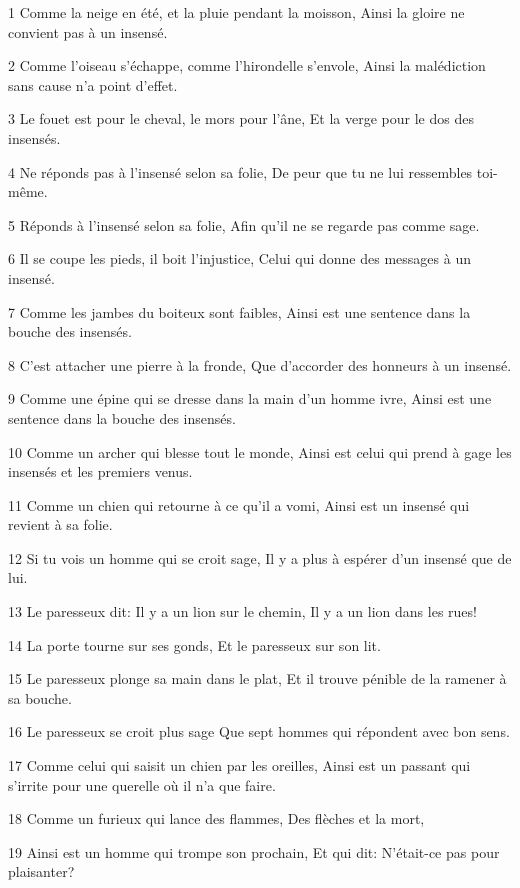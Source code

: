 \par 1 Comme la neige en été, et la pluie pendant la moisson, Ainsi la gloire ne convient pas à un insensé.
\par 2 Comme l'oiseau s'échappe, comme l'hirondelle s'envole, Ainsi la malédiction sans cause n'a point d'effet.
\par 3 Le fouet est pour le cheval, le mors pour l'âne, Et la verge pour le dos des insensés.
\par 4 Ne réponds pas à l'insensé selon sa folie, De peur que tu ne lui ressembles toi-même.
\par 5 Réponds à l'insensé selon sa folie, Afin qu'il ne se regarde pas comme sage.
\par 6 Il se coupe les pieds, il boit l'injustice, Celui qui donne des messages à un insensé.
\par 7 Comme les jambes du boiteux sont faibles, Ainsi est une sentence dans la bouche des insensés.
\par 8 C'est attacher une pierre à la fronde, Que d'accorder des honneurs à un insensé.
\par 9 Comme une épine qui se dresse dans la main d'un homme ivre, Ainsi est une sentence dans la bouche des insensés.
\par 10 Comme un archer qui blesse tout le monde, Ainsi est celui qui prend à gage les insensés et les premiers venus.
\par 11 Comme un chien qui retourne à ce qu'il a vomi, Ainsi est un insensé qui revient à sa folie.
\par 12 Si tu vois un homme qui se croit sage, Il y a plus à espérer d'un insensé que de lui.
\par 13 Le paresseux dit: Il y a un lion sur le chemin, Il y a un lion dans les rues!
\par 14 La porte tourne sur ses gonds, Et le paresseux sur son lit.
\par 15 Le paresseux plonge sa main dans le plat, Et il trouve pénible de la ramener à sa bouche.
\par 16 Le paresseux se croit plus sage Que sept hommes qui répondent avec bon sens.
\par 17 Comme celui qui saisit un chien par les oreilles, Ainsi est un passant qui s'irrite pour une querelle où il n'a que faire.
\par 18 Comme un furieux qui lance des flammes, Des flèches et la mort,
\par 19 Ainsi est un homme qui trompe son prochain, Et qui dit: N'était-ce pas pour plaisanter?
